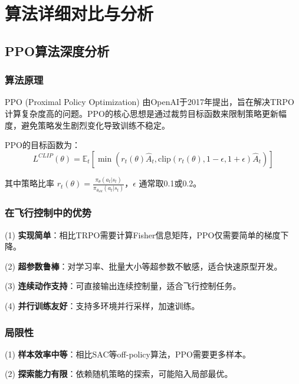 
\section{算法详细对比与分析}\label{sec:algorithm_analysis}

\subsection{PPO算法深度分析}

\subsubsection{算法原理}

PPO (Proximal Policy Optimization) 由OpenAI于2017年提出，旨在解决TRPO计算复杂度高的问题。PPO的核心思想是通过裁剪目标函数来限制策略更新幅度，避免策略发生剧烈变化导致训练不稳定。

PPO的目标函数为：
\begin{equation}
L^{CLIP}(\theta) = \mathbb{E}_t\left[\min\left(r_t(\theta)\hat{A}_t, \text{clip}(r_t(\theta), 1-\epsilon, 1+\epsilon)\hat{A}_t\right)\right]
\end{equation}

其中策略比率 $r_t(\theta) = \frac{\pi_\theta(a_t|s_t)}{\pi_{\theta_{old}}(a_t|s_t)}$，$\epsilon$ 通常取0.1或0.2。

\subsubsection{在飞行控制中的优势}

(1) \textbf{实现简单}：相比TRPO需要计算Fisher信息矩阵，PPO仅需要简单的梯度下降。

(2) \textbf{超参数鲁棒}：对学习率、批量大小等超参数不敏感，适合快速原型开发。

(3) \textbf{连续动作支持}：可直接输出连续控制量，适合飞行控制任务。

(4) \textbf{并行训练友好}：支持多环境并行采样，加速训练。

\subsubsection{局限性}

(1) \textbf{样本效率中等}：相比SAC等off-policy算法，PPO需要更多样本。

(2) \textbf{探索能力有限}：依赖随机策略的探索，可能陷入局部最优。

